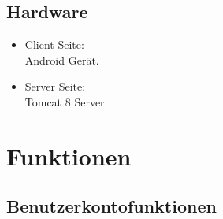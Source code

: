 \documentclass[parskip=full]{scrartcl}
\begin{document}
\subsection{Hardware}
\begin{itemize}
\item Client Seite: \\ Android Gerät.\\
\item Server Seite: \\ Tomcat 8 Server.
\end{itemize}

\newpage
\section{Funktionen}

\subsection{Benutzerkontofunktionen}
\end{document}
